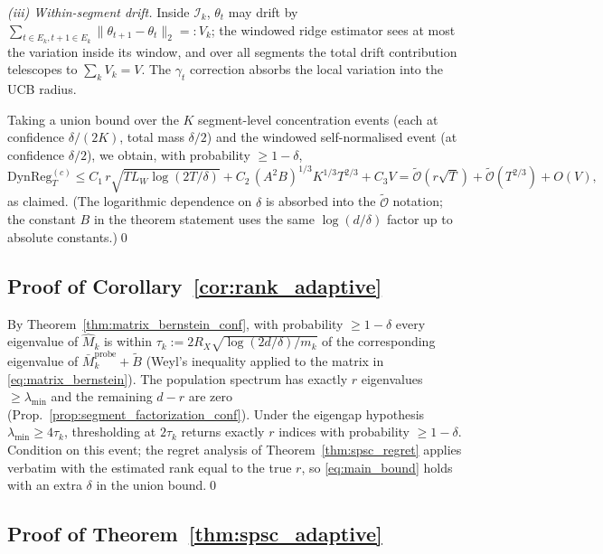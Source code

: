 \documentclass{article}
\newcommand{\cI}{\mathcal{I}}
\newcommand{\tilO}{\widetilde{\mathcal{O}}}
\newcommand{\DynReg}{\mathrm{DynReg}}
\begin{document}
\emph{(iii) Within-segment drift.}
Inside $\cI_k$, $\theta_t$ may drift by $\sum_{t\in E_k, t+1\in E_k}
\|\theta_{t+1}-\theta_t\|_2 =: V_k$; the windowed ridge estimator sees
at most the variation inside its window, and over all segments the
total drift contribution telescopes to
$\sum_k V_k = V$. The $\gamma_t$ correction absorbs the local
variation into the UCB radius.

Taking a union bound over the $K$ segment-level concentration events
(each at confidence $\delta/(2K)$, total mass $\delta/2$) and the
windowed self-normalised event (at confidence $\delta/2$), we obtain,
with probability $\ge 1-\delta$,
\[
\DynReg_T^{(c)}
\le C_1\, r\sqrt{T L_W \log(2T/\delta)}
+ C_2\, (A^2 B)^{1/3} K^{1/3} T^{2/3}
+ C_3 V
= \tilO(r\sqrt{T}) + \tilO(T^{2/3}) + O(V),
\]
as claimed. (The logarithmic dependence on $\delta$ is absorbed into
the $\tilO$ notation; the constant $B$ in the theorem statement uses
the same $\log(d/\delta)$ factor up to absolute constants.)\qed

\subsection{Proof of Corollary~\ref{cor:rank_adaptive}}
\label{app:proof_adaptive_rank}

By Theorem~\ref{thm:matrix_bernstein_conf}, with probability
$\ge 1-\delta$ every eigenvalue of $\widehat M_k$ is within
$\tau_k := 2R_X\sqrt{\log(2d/\delta)/m_k}$ of the corresponding
eigenvalue of $\bar M_k^{\mathrm{probe}} + \widetilde B$ (Weyl's
inequality applied to the matrix in
\eqref{eq:matrix_bernstein}). The population spectrum has exactly $r$
eigenvalues $\ge\lambda_{\min}$ and the remaining $d-r$ are zero
(Prop.~\ref{prop:segment_factorization_conf}). Under the eigengap
hypothesis $\lambda_{\min}\ge 4\tau_k$, thresholding at $2\tau_k$
returns exactly $r$ indices with probability $\ge 1-\delta$. Condition
on this event; the regret analysis of Theorem~\ref{thm:spsc_regret}
applies verbatim with the estimated rank equal to the true $r$, so
\eqref{eq:main_bound} holds with an extra $\delta$ in the union bound.\qed

\subsection{Proof of Theorem~\ref{thm:spsc_adaptive}}
\label{app:proof_adaptive}
\end{document}

